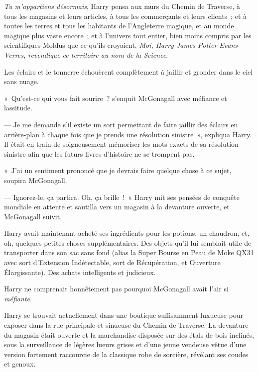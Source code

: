 \emph{Tu m'appartiens désormais}, Harry pensa aux murs du Chemin de Traverse, à tous les magasins et leurs articles, à tous les commerçants et leurs clients~; et à toutes les terres et tous les habitants de l'Angleterre magique, et au monde magique plus vaste encore~; et à l'univers tout entier, bien moins compris par les scientifiques Moldus que ce qu'ils croyaient.
\emph{Moi, Harry James Potter-Evans-Verres, revendique ce territoire au nom de la Science}.

Les éclairs et le tonnerre échouèrent complètement à jaillir et gronder dans le ciel sans nuage.

«~Qu'est-ce qui vous fait sourire~? s'enquit McGonagall avec méfiance et lassitude.

--- Je me demande s'il existe un sort permettant de faire jaillir des éclairs en arrière-plan à chaque fois que je prends une résolution sinistre~», expliqua Harry.
Il était en train de soigneusement mémoriser les mots exacts de sa résolution sinistre afin que les futurs livres d'histoire ne se trompent pas.

«~J'ai un sentiment prononcé que je devrais faire quelque chose à ce sujet, soupira McGonagall.

--- Ignorez-le, ça partira. Oh, ça brille~!~» Harry mit ses pensées de conquête mondiale en attente et sautilla vers un magasin à la devanture ouverte, et McGonagall suivit.

\later

Harry avait maintenant acheté ses ingrédients pour les potions, un chaudron, et, oh, quelques petites choses supplémentaires.
Des objets qu'il lui semblait utile de transporter dans son sac sans fond (alias la Super Bourse en Peau de Moke QX31 avec sort d'Extension Indétectable, sort de Récupération, et Ouverture Élargissante).
Des achats intelligents et judicieux.

Harry ne comprenait honnêtement pas pourquoi McGonagall avait l'air si \emph{méfiante}.

Harry se trouvait actuellement dans une boutique suffisamment luxueuse pour exposer dans la rue principale et sinueuse du Chemin de Traverse.
La devanture du magasin était ouverte et la marchandise disposée sur des étals de bois inclinés, sous la surveillance de légères lueurs grises et d'une jeune vendeuse vêtue d’une version fortement raccourcie de la classique robe de sorcière, révélant ses coudes et genoux.

